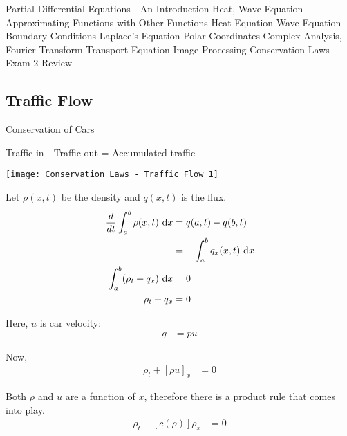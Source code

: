 \documentclass{article}
\begin{document}
\maketitle
%
\newpage
%
\tableofcontents
\newpage
{Partial Differential Equations - An Introduction}
{Heat, Wave Equation}
{Approximating Functions with Other Functions}
{Heat Equation}
{Wave Equation}
{Boundary Conditions}
{Laplace's Equation}
{Polar Coordinates}
{Complex Analysis, Fourier Transform}
{Transport Equation}
{Image Processing}
{Conservation Laws}
{Exam 2 Review}
\newpage
\subsection{Traffic Flow}
Conservation of Cars

Traffic in - Traffic out = Accumulated traffic

\begin{center}
  \texttt{[image: Conservation Laws - Traffic Flow 1]}
\end{center}

Let $\rho(x, t)$ be the density and $q(x, t)$ is the flux.
%
\begin{align}
  \frac{d}{dt} \int^b_a \rho(x, t)\ \text dx
  & = q(a, t) - q(b, t)\\
  & = -\int^b_a q_x (x, t)\ \text dx\\
  \int^b_a (\rho_t + q_x)\ \text dx & = 0\\
  \rho_t + q_x & = 0
\end{align}

Here, $u$ is car velocity:
%
\begin{align}
  q & = pu
\end{align}

Now,
%
\begin{align}
  \rho_t + [\rho u]_x & = 0
\end{align}

Both $\rho$ and $u$ are a function of $x$, therefore there is a product rule that comes into play.
%
\begin{align}
  \rho_t + [c(\rho)]\rho_x & = 0
\end{align}
\end{document}

